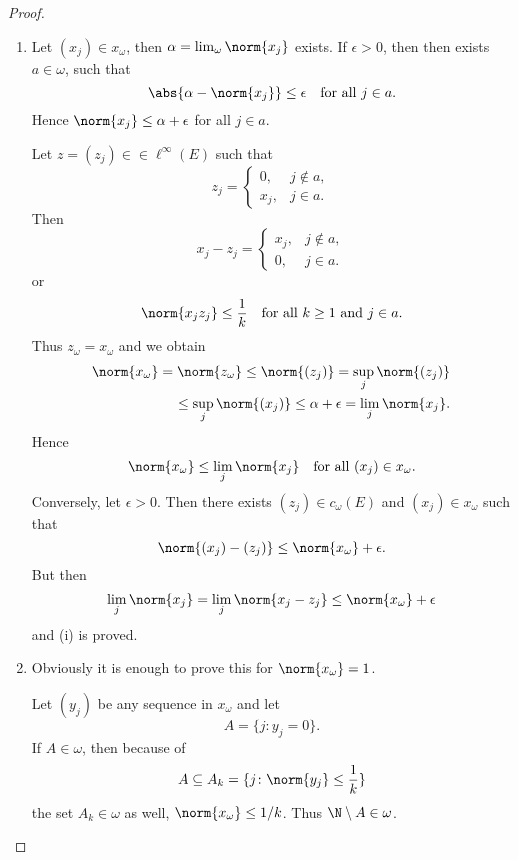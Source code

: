 \documentclass[%
	,english 
	,headings	= small 
	,leqno
	,parskip		= half+
	,DIV			= 14
	,BCOR 			= 10mm	
		]{scrartcl}
\begin{document}
\begin{multicols}{2}
\begin{proposition}
\begin{myenumerate}
\end{myenumerate}

\end{proposition}
%
\begin{proof}
\begin{enumerate}[\upshape (i), wide, labelindent=.5em]
\item
Let $ (x_{j}) \in x_{\omega} $, then $ \alpha = \lim_{ \omega } \norm{ x_{j} } $ exists.
If $  \epsilon > 0 $, then then exists $  a \in \omega $, such that
%
\[
	\abs{ \alpha - \norm{ x_{j} } } \leq \epsilon \quad \text{for all $  j \in a  $.}
\]
%
Hence $ \norm{ x_{j} } \leq \alpha + \epsilon $ for all $  j \in a  $.

Let $ z = (z_{j}) \in  \in \ell^{ \infty }( E ) $ such that
%
\[
	z_{j} =
	\begin{cases}
	0 , 	& j \notin a , \\
	x_{j}, 	& j \in a .
	\end{cases}
\]
%
Then
%
\[
	x_{j} - z_{j} =
	\begin{cases}
	x_{j} , 	& j \notin a , \\
	0, 			& j \in a .
	\end{cases}
\]
%
or
%
\[
	\norm{ x_{j} z_{j} } \leq \frac{1}{k} \quad \text{for all $  k \geq 1 $ and $ j \in a $.}
\]
%
Thus $ z_{ \omega } = x_{ \omega } $ and we obtain
\begin{align*}
	\norm{ x_{ \omega } } = \norm{ z_{ \omega } } \leq \norm{ (z_{j}) } = \sup_{j} \norm{ (z_{j}) } \\
	\leq \sup_{j} \norm{ (x_{j}) } \leq \alpha + \epsilon = \lim_{j} \norm{ x_{j} }.
\end{align*} 
Hence 
%
\[
	\norm{ x_{ \omega } } \leq \lim_{j} \norm{ x_{j} } \quad \text{for all $ (x_{j}) \in x_{ \omega } $.}
\]
%
Conversely, let $ \epsilon > 0 $.
Then there exists $ (z_{j}) \in c_{ \omega }(E) $ and $ (x_{j}) \in x_{ \omega } $ such that
%
\[
	\norm{ (x_{j}) - (z_{j}) } \leq \norm{ x_{ \omega } } + \epsilon .
\]
%
But then 
%
\[
	\lim_{j }\norm{ x_{j} } = \lim_{j} \norm{ x_{j}  -  z_{j}  } \leq \norm{ x_{ \omega } } + \epsilon 
\]
%
and (i) is proved.
\item
Obviously it is enough to prove this for $ \norm{ x_{ \omega } } = 1$.

Let $ ( y_{ j } ) $ be any sequence in $ x_{ \omega } $ and let 
%
\[
    A = \{ j  \colon y_{ j } = 0 \}  . 
\]
%
If $ A \in \omega $, then because of
%
\[
    A \subseteq A_{ k } = \{ j \colon \norm{ y_{ j } } \leq \frac{ 1 }{ k } \}
\]
the set $ A_{ k } \in \omega $ as well, \ie $ \norm{ x_{ \omega } } \leq 1/k $.
Thus $ \N \setminus A \in \omega $.


\end{enumerate}
\end{proof}
\end{multicols}
\end{document}
